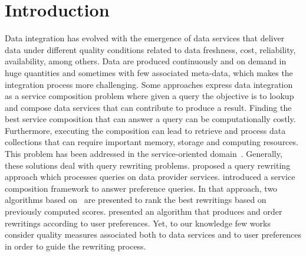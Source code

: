 \section{Introduction}
Data integration has evolved with the emergence of data services that deliver
data under different quality conditions related to data freshness, cost, reliability,
availability, among others. Data are produced continuously and on demand in huge
quantities and sometimes with few associated meta-data, which makes the
integration process more challenging. Some approaches express data integration
as a service composition problem where given a query the objective is to lookup and compose data services that can contribute to produce a result. Finding the best service composition that can answer a query can be computationally costly. Furthermore,  executing the composition can lead to retrieve and process data collections that can require important memory, storage and computing resources.
This problem has been addressed in the service-oriented
domain~\cite{Barhamgi2010,Benouaret2011,ba2014}.
Generally, these solutions deal with query rewriting problems.
\cite{Barhamgi2010} proposed a query rewriting approach which processes queries
on data provider services. \cite{Benouaret2011} introduced a service composition
framework to answer preference queries. In that approach, two algorithms based
on~\cite{Barhamgi2010} are presented to rank the best rewritings based on previously computed scores.
\cite{ba2014} presented an algorithm that produces and order rewritings
according to user preferences. Yet, to our knowledge few works consider quality
measures associated both to data services and to user preferences in order to
guide the rewriting process. 


